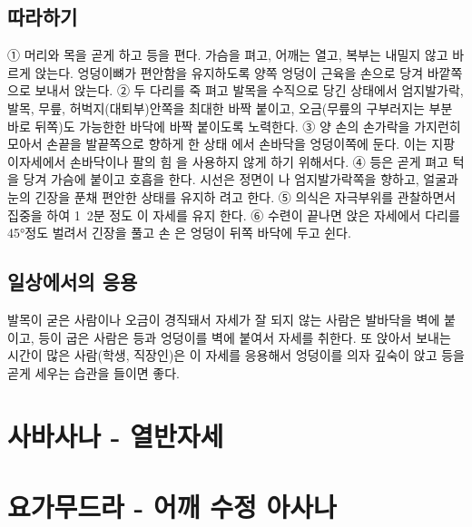 \documentclass[12pt, a4paper, oneside]{book}
\let\stdsection\section
\renewcommand\section{\newpage\stdsection}
\begin{document}
\subsection{따라하기}
① 머리와 목을 곧게 하고 등을 편다. 가슴을 펴고, 어깨는 열고, 복부는 
내밀지 않고 바르게 앉는다. 엉덩이뼈가 편안함을 유지하도록 양쪽 엉덩이 
근육을 손으로 당겨 바깥쪽으로 보내서 앉는다.
② 두 다리를 죽 펴고 발목을 수직으로 당긴 상태에서 엄지발가락, 발목, 
무릎, 허벅지(대퇴부)안쪽을 최대한 바짝 붙이고, 오금(무릎의 구부러지는 
부분 바로 뒤쪽)도 가능한한 바닥에 바짝 붙이도록 노력한다. 
③ 양 손의 손가락을 가지런히 모아서 손끝을 발끝쪽으로 향하게 한 상태
에서 손바닥을 엉덩이쪽에 둔다. 이는 지팡이자세에서 손바닥이나 팔의 힘
을 사용하지 않게 하기 위해서다.
④ 등은 곧게 펴고 턱을 당겨 가슴에 붙이고 호흡을 한다. 시선은 정면이
나 엄지발가락쪽을 향하고, 얼굴과 눈의 긴장을 푼채 편안한 상태를 유지하
려고 한다.
⑤ 의식은 자극부위를 관찰하면서 집중을 하여 1~2분 정도 이 자세를 유지
한다.
⑥ 수련이 끝나면 앉은 자세에서 다리를 45°정도 벌려서 긴장을 풀고 손
은 엉덩이 뒤쪽 바닥에 두고 쉰다.

\subsection{일상에서의 응용}
발목이 굳은 사람이나 오금이 경직돼서 자세가 잘 되지 않는 사람은 발바닥을 벽에 붙이고, 등이 굽은 사람은 등과 엉덩이를 벽에 붙여서 자세를 취한다.
또 앉아서 보내는 시간이 많은 사람(학생, 직장인)은 이 자세를 응용해서 엉덩이를 의자 깊숙이 앉고 등을 곧게 세우는 습관을 들이면 좋다. 








%
%
%
\section{사바사나 - 열반자세}



%
%
%
\section{요가무드라 - 어깨 수정 아사나}
\end{document}
